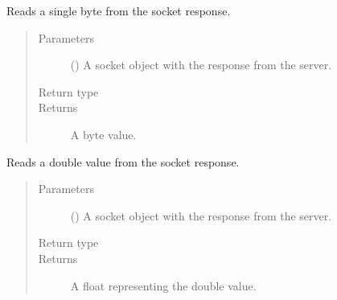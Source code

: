 \documentclass[letterpaper,10pt,english]{sphinxmanual}
\begin{document}

\begin{fulllineitems}
\label{\detokenize{index:secondodb.api.support.secondoinputhandler.read_byte}}
Reads a single byte from the socket response.
\begin{quote}\begin{description}
\item[{Parameters}] \leavevmode
{} () \textendash{} A socket object with the response from the  server.

\item[{Return type}] \leavevmode
{}

\item[{Returns}] \leavevmode
A byte value.

\end{description}\end{quote}

\end{fulllineitems}


\begin{fulllineitems}
\label{\detokenize{index:secondodb.api.support.secondoinputhandler.read_double}}
Reads a double value from the socket response.
\begin{quote}\begin{description}
\item[{Parameters}] \leavevmode
{} () \textendash{} A socket object with the response from the  server.

\item[{Return type}] \leavevmode
{}

\item[{Returns}] \leavevmode
A float representing the double value.

\end{description}\end{quote}

\end{fulllineitems}
\end{document}
